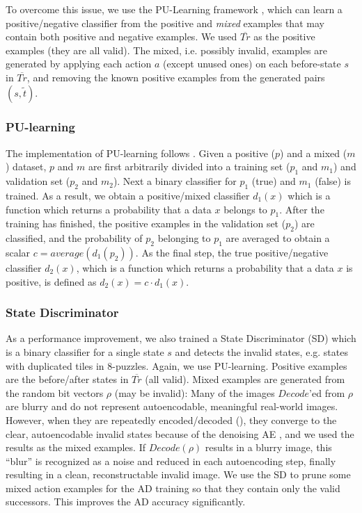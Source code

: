\documentclass[10pt,letterpaper]{article}
\begin{document}
To overcome this issue, we use the PU-Learning framework \cite{elkan2008learning}, which can learn a positive/negative classifier from the positive and \emph{mixed} examples that may contain both positive and negative examples.
% 
We used $\overline{Tr}$ as the positive examples (they are all valid).
The mixed, i.e. possibly invalid, examples are generated by
applying each action $a$ (except unused ones) on each before-state $s$ in $\overline{Tr}$, and
removing the known positive examples from the generated pairs $(s,\tilde{t})$.

\subsubsection{PU-learning}
\label{sec:pu-learning}

The implementation of PU-learning follows \cite{elkan2008learning}.
Given a positive ($p$) and a mixed ($m$) dataset,
 $p$ and $m$ are first arbitrarily divided into a training set ($p_1$ and $m_1$)
and validation set ($p_2$ and $m_2$).
% 
Next a binary classifier for $p_1$ (true) and $m_1$ (false) is trained.
As a result, we obtain a positive/mixed classifier $d_1(x)$ which is a function which returns a probability
that a data $x$ belongs to $p_1$.
% 
After the training has finished,
the positive examples in the validation set ($p_2$) are classified, and
the  probability of $p_2$ belonging to $p_1$ are averaged to obtain a scalar $c = average(d_1(p_2))$.
% 
As the final step, the true positive/negative classifier $d_2(x)$,
which is a function which returns a probability that a data $x$ is positive,
is defined as $d_2(x) = c \cdot d_1(x)$. 

\subsubsection{State Discriminator}

As a performance improvement, we also trained a State Discriminator (SD) which is a binary classifier for a single state $s$ and detects the invalid states, e.g. states with duplicated tiles in 8-puzzles. Again, we use PU-learning. Positive examples are the before/after states in $\overline{Tr}$ (all valid). Mixed examples are generated from the random bit vectors $\rho$ (may be invalid):
Many of the images $Decode$'ed from $\rho$ are blurry and do not represent autoencodable, meaningful real-world images.
However, when they are repeatedly encoded/decoded (), they converge to the clear, autoencodable invalid states because of the denoising AE \cite{vincent2008extracting}, and we used the results as the mixed examples.
If $Decode(\rho)$ results in a blurry image,
this ``blur'' is recognized as a noise and reduced in each autoencoding step,
finally resulting in a clean, reconstructable invalid image.
We use the SD to prune some mixed action examples for the AD training so that they contain only the valid successors.
This improves the AD accuracy significantly.
\end{document}
